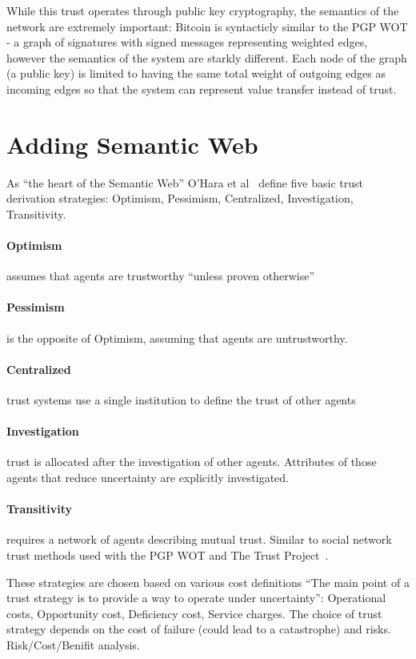 \documentclass{acm_proc_article-sp}
\begin{document}
While this trust operates through public key cryptography, the semantics of the network are extremely important: Bitcoin is syntacticly similar to the PGP WOT - a graph of signatures with signed messages representing weighted edges, however the semantics of the system are starkly different. Each node of the graph (a public key) is limited to having the same total weight of outgoing edges as incoming edges so that the system can represent value transfer instead of trust.

\cite{golbeck_trust_2003}

\section{Adding Semantic Web}
As ``the heart of the Semantic Web'' O'Hara et al~\cite{ohara_trust_2004} define five basic trust derivation strategies: Optimism, Pessimism, Centralized, Investigation, Transitivity.

\paragraph{Optimism} assumes that agents are trustworthy ``unless proven otherwise''
\paragraph{Pessimism} is the opposite of Optimism, assuming that agents are untrustworthy.
\paragraph{Centralized} trust systems use a single institution to define the trust of other agents
\paragraph{Investigation} trust is allocated after the investigation of other agents. Attributes of those agents that reduce uncertainty are explicitly investigated.
\paragraph{Transitivity} requires a network of agents describing mutual trust. Similar to social network trust methods used with the PGP WOT and The Trust Project~\cite{_how_pgp_1999,golbeck_trust_2003}.

These strategies are chosen based on various cost definitions ``The main point of a trust strategy is to provide a way to operate under uncertainty'': Operational costs, Opportunity cost, Deficiency cost, Service charges. The choice of trust strategy depends on the cost of failure (could lead to a catastrophe) and risks.  Risk/Cost/Benifit analysis.
\end{document}
